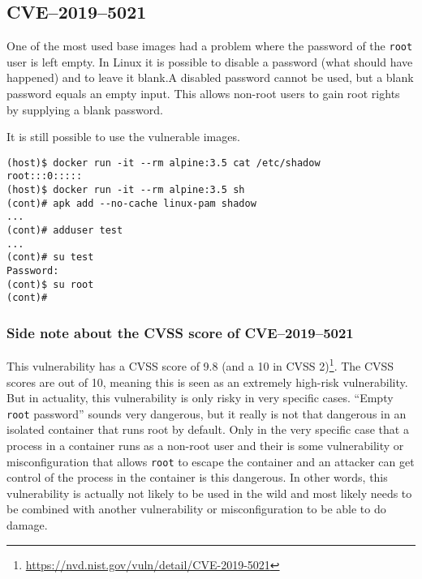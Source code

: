 \subsection{CVE--2019--5021}\label{CVE-2019-5021}

One of the most used base images had a problem where the password of the \lstinline{root} user is left empty. In Linux it is possible to disable a password (what should have happened) and to leave it blank.A disabled password cannot be used, but a blank password equals an empty input. This allows non-root users to gain root rights by supplying a blank password.

\hfill

It is still possible to use the vulnerable images.
\begin{lstlisting}
(host)$ docker run -it --rm alpine:3.5 cat /etc/shadow
root:::0:::::
(host)$ docker run -it --rm alpine:3.5 sh
(cont)# apk add --no-cache linux-pam shadow
...
(cont)# adduser test
...
(cont)# su test
Password:
(cont)$ su root
(cont)#
\end{lstlisting}

\subsubsection{Side note about the CVSS score of CVE--2019--5021}

This vulnerability has a CVSS score of 9.8 (and a 10 in CVSS 2)\footnote{\url{https://nvd.nist.gov/vuln/detail/CVE-2019-5021}}. The CVSS scores are out of 10, meaning this is seen as an extremely high-risk vulnerability. But in actuality, this vulnerability is only risky in very specific cases. ``Empty \lstinline{root} password'' sounds very dangerous, but it really is not that dangerous in an isolated container that runs root by default. Only in the very specific case that a process in a container runs as a non-root user and their is some vulnerability or misconfiguration that allows \lstinline{root} to escape the container and an attacker can get control of the process in the container is this dangerous. In other words, this vulnerability is actually not likely to be used in the wild and most likely needs to be combined with another vulnerability or misconfiguration to be able to do damage.
